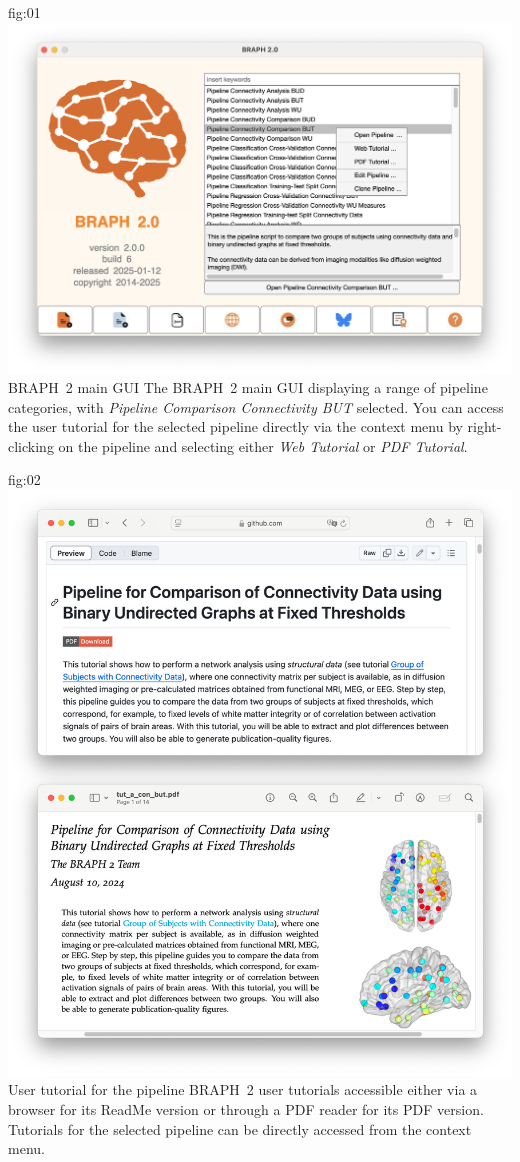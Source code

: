 \documentclass[justified]{tufte-handout}
\begin{document}
{fig:01}
{
	\includegraphics{fig01.png}
}
{BRAPH~2 main GUI}
{
	The BRAPH~2 main GUI displaying a range of pipeline categories, with \textit{Pipeline Comparison Connectivity BUT} selected. You can access the user tutorial for the selected pipeline directly via the context menu by right-clicking on the pipeline and selecting either \textit{Web Tutorial} or \textit{PDF Tutorial}.
}


{fig:02}
{
	\includegraphics{fig02.png}
}
{User tutorial for the pipeline}
{
	BRAPH~2 user tutorials accessible either via a browser for its ReadMe version or through a PDF reader for its PDF version. Tutorials for the selected pipeline can be directly accessed from the context menu.
}
\end{document}
